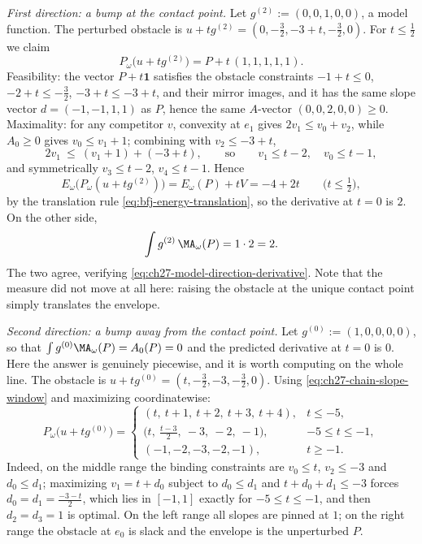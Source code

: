 \begin{example}
\emph{First direction: a bump at the contact point.}  Let
$g^{(2)}:=(0,0,1,0,0)$, a model function.  The perturbed obstacle is
$u+tg^{(2)}=(0,-\tfrac32,-3+t,-\tfrac32,0)$.  For $t\leq\tfrac12$ we
claim
\[
 P_\omega\bigl(u+tg^{(2)}\bigr)=P+t\,(1,1,1,1,1).
\]
Feasibility: the vector $P+t\mathbf 1$ satisfies the obstacle constraints
$-1+t\leq0$, $-2+t\leq-\tfrac32$, $-3+t\leq-3+t$, and their mirror
images, and it has the same slope vector $d=(-1,-1,1,1)$ as $P$, hence
the same $A$-vector $(0,0,2,0,0)\geq0$.  Maximality: for any competitor
$v$, convexity at $e_1$ gives $2v_1\leq v_0+v_2$, while $A_0\geq0$
gives $v_0\leq v_1+1$; combining with $v_2\leq-3+t$,
\[
 2v_1\ \leq\ (v_1+1)+(-3+t),
 \qquad\text{so}\qquad v_1\leq t-2,\quad v_0\leq t-1,
\]
and symmetrically $v_3\leq t-2$, $v_4\leq t-1$.  Hence
\[
 E_\omega\bigl(P_\omega(u+tg^{(2)})\bigr)
 =E_\omega(P)+tV=-4+2t
 \qquad\bigl(t\leq\tfrac12\bigr),
\]
by the translation rule \eqref{eq:bfj-energy-translation}, so the derivative
at $t=0$ is $2$.  On the other side,
\[
 \int g^{(2)}\,\MA_\omega(P)=1\cdot2=2 .
\]
The two agree, verifying
\eqref{eq:ch27-model-direction-derivative}.  Note that the measure did not
move at all here: raising the obstacle at the unique contact point simply
translates the envelope.

\emph{Second direction: a bump away from the contact point.}  Let
$g^{(0)}:=(1,0,0,0,0)$, so that $\int g^{(0)}\MA_\omega(P)=A_0(P)=0$ and
the predicted derivative at $t=0$ is $0$.  Here the answer is genuinely
piecewise, and it is worth computing on the whole line.  The obstacle is
$u+tg^{(0)}=(t,-\tfrac32,-3,-\tfrac32,0)$.  Using
\eqref{eq:ch27-chain-slope-window} and maximizing coordinatewise:
\[
 P_\omega\bigl(u+tg^{(0)}\bigr)
 =\begin{cases}
   (t,\ t+1,\ t+2,\ t+3,\ t+4), & t\leq-5,\\[2pt]
   \bigl(t,\ \tfrac{t-3}2,\ -3,\ -2,\ -1\bigr), & -5\leq t\leq-1,\\[2pt]
   (-1,-2,-3,-2,-1), & t\geq-1 .
  \end{cases}
\]
Indeed, on the middle range the binding constraints are $v_0\leq t$,
$v_2\leq-3$ and $d_0\leq d_1$; maximizing $v_1=t+d_0$ subject to
$d_0\leq d_1$ and $t+d_0+d_1\leq-3$ forces
$d_0=d_1=\tfrac{-3-t}2$, which lies in $[-1,1]$ exactly for
$-5\leq t\leq-1$, and then $d_2=d_3=1$ is optimal.  On the left range all
slopes are pinned at $1$; on the right range the obstacle at $e_0$ is
slack and the envelope is the unperturbed $P$.


\end{example}
